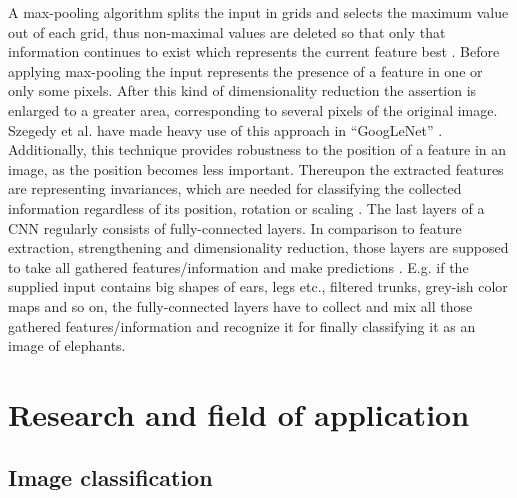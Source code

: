\documentclass[12pt,twoside]{article}
\theoremstyle{plain}
\theoremstyle{definition}
\theoremstyle{remark}
\begin{document}
A max-pooling algorithm splits the input in grids and selects the maximum value out of each grid, thus non-maximal values are deleted so that only that information continues to exist which represents the current feature best \cite{GoogLeNet, ImangeNetClassificationCNN-Krizhevsky}.
Before applying max-pooling the input represents the presence of a feature in one or only some pixels. After this kind of dimensionality reduction the assertion is enlarged to a greater area, corresponding to several pixels of the original image. Szegedy et al. have made heavy use of this approach in \enquote{GoogLeNet} \cite{GoogLeNet}.
Additionally, this technique provides robustness to the position of a feature in an image, as the position becomes less important. Thereupon the extracted features are representing invariances, which are needed for classifying the collected information regardless of its position, rotation or scaling \cite{Invariances-Neural-Network-Khotanzad}.
The last layers of a CNN regularly consists of fully-connected layers. In comparison to feature extraction, strengthening and dimensionality reduction, those layers are supposed to take all gathered features/information and make predictions \cite{DeepNeuralNetworksObjectDetection-Szegedy, Multi-column-dnn-for-traffic-signs-ciresan, MultiColumnDeepNeuralNetworksClassification-Ciresan}. E.g. if the supplied input contains big shapes of ears, legs etc., filtered trunks, grey-ish color maps and so on, the fully-connected layers have to collect and mix all those gathered features/information and recognize it for finally classifying it as an image of elephants.



\section{Research and field of application}
\label{sec:research_and_application}


\subsection{Image classification}
\end{document}
